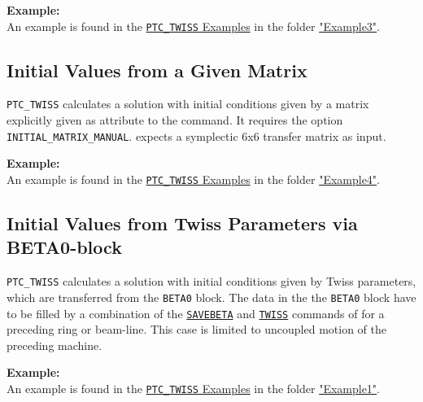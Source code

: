 \textbf{Example:} \\
An example is found in the
\href{http://madx.web.cern.ch/madx/madX/examples/ptc_twiss/}
{\texttt{PTC\_TWISS} Examples} in the folder
\href{http://madx.web.cern.ch/madx/madX/examples/ptc_twiss/Example3}
{"Example3"}. 


\subsection{Initial Values from a Given Matrix}
\label{subsec:from-given-matrix}

\texttt{PTC\_TWISS} calculates a solution with initial conditions given
by a matrix explicitly given as attribute to the command. 
It requires the option \texttt{INITIAL\_MATRIX\_MANUAL}. 
\madx expects a symplectic 6x6 transfer matrix as input. 


\textbf{Example:} \\
An example is found in the
\href{http://madx.web.cern.ch/madx/madX/examples/ptc_twiss/}
{\texttt{PTC\_TWISS} Examples} in the folder
\href{http://madx.web.cern.ch/madx/madX/examples/ptc_twiss/Example4}
{"Example4"}. 


\subsection{Initial Values from Twiss Parameters via BETA0-block}
\label{subsec:from-beta0-block}

\texttt{PTC\_TWISS} calculates a solution with initial conditions given by
Twiss parameters, which are transferred from the \texttt{BETA0} block.  The
data in the the \texttt{BETA0} block have to be filled by a combination of
the \hyperref[sec:savebeta]{\texttt{SAVEBETA}} and
\hyperref[chap:twiss]{\texttt{TWISS}} commands of \madx for a preceding
ring or beam-line. This case is limited to uncoupled motion of the
preceding machine. 

      
\textbf{Example:} \\
An example is found in the
\href{http://madx.web.cern.ch/madx/madX/examples/ptc_twiss/}
{\texttt{PTC\_TWISS} Examples} in the folder
\href{http://madx.web.cern.ch/madx/madX/examples/ptc_twiss/Example1}
{"Example1"}. 



